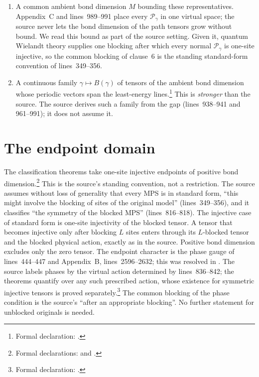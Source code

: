 \documentclass{article}
\begin{document}
\begin{enumerate}
          bond dimension on the blocked chain. Source: separation within MPS
          (lines~923--933), unique ground state $|\mu[\mathcal P_\gamma]\rangle$
          with $\mathcal P_\gamma$ in standard form (lines~957--960), injective
          meaning unique ground state (lines~813--816). Matches; nonvanishing
          of the vector follows from the injective representative.
    \item A common ambient bond dimension $M$ bounding these representatives.
          Appendix~C and lines~989--991 place every $\mathcal P_\gamma$ in one
          virtual space; the source never lets the bond dimension of the path
          tensors grow without bound. We read this bound as part of the source
          setting. Given it, quantum Wielandt theory supplies one blocking
          after which every normal $\mathcal P_\gamma$ is one-site injective,
          so the common blocking of clause~6 is the standing standard-form
          convention of lines~349--356.
    \item A continuous family $\gamma\mapsto B(\gamma)$ of tensors of the
          ambient bond dimension whose periodic vectors span the least-energy
          lines.\footnote{Formal declaration:
              .}
          This is \emph{stronger} than the source. The source derives such a
          family from the gap (lines~938--941 and 961--991); it does not
          assume it.
\end{enumerate}

\section{The endpoint domain}

The classification theorems take one-site injective endpoints of positive
bond dimension.\footnote{Formal declarations:
     and
    .}
This is the source's standing convention, not a restriction. The source
assumes without loss of generality that every MPS is in standard form, ``this
might involve the blocking of sites of the original model''
(lines~349--356), and it classifies ``the symmetry of the blocked MPS''
(lines~816--818). The injective case of standard form is one-site
injectivity of the blocked tensor. A tensor that becomes injective only after
blocking $L$ sites enters through its $L$-blocked tensor and the blocked
physical action, exactly as in the source. Positive bond dimension excludes
only the zero tensor. The endpoint character is the phase gauge of
lines~444--447 and Appendix~B, lines~2596--2632; this was resolved in
. The source labels phases by
the virtual action determined by lines~836--842; the theorems quantify over
any such prescribed action, whose existence for symmetric injective tensors
is proved separately.\footnote{Formal declaration:
    .}
The common blocking of the phase condition is the source's ``after an
appropriate blocking''. No further statement for unblocked originals is
needed.
\end{document}
